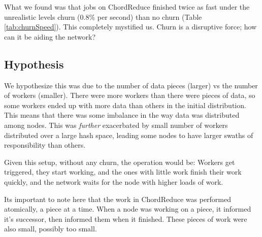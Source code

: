 What we found was that jobs on ChordReduce finished twice as fast under the unrealistic levels churn (0.8\% per second) than no churn (Table \ref{tab:churnSpeed}).
This completely mystified us.
Churn is a disruptive force; how can it be aiding the network?

\subsection*{Hypothesis}
We hypothesize this was due to the number of data pieces (larger) vs the number of workers (smaller).
There were more workers than there were pieces of data, so some workers ended up with more data than others in the initial distribution.
This means that there was some imbalance in the way data was distributed among nodes.
This was \textit{further} exacerbated by small number of workers distributed over a large hash space, leading some nodes to have larger swaths of responsibility than others.

Given this setup, without any churn, the operation would be:
Workers get triggered, they start working, and the ones with little work finish their work quickly, and the network waits for the node with higher loads of work.

Its important to note here that the work in ChordReduce was performed atomically, a piece at a time.
When a node was working on a piece, it informed it's successor, then informed them when it finished.
These pieces of work were also small, possibly too small.

